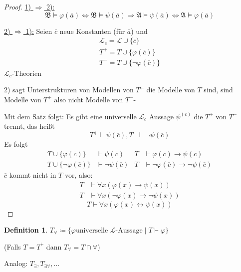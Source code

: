 \documentclass[12pt,parskip=full]{scrartcl}
\newcommand{\heading}{\underline}
\theoremstyle{definition}
\newtheorem{definition}[theorem]{Definition}
\begin{document}
	\begin{proof}
		\heading{1) $\Rightarrow$ 2):}
		\begin{equation*}
			\mathfrak{B} \models \varphi(\overline{a}) \Leftrightarrow \mathfrak{B} \models \psi(\overline{a}) \Rightarrow \mathfrak{A} \models \psi(\overline{a}) \Leftrightarrow \mathfrak{A} \models \varphi(\overline{a})
		\end{equation*}
		
		\heading{2) $\Rightarrow$ 1):}
		Seien $\overline{c}$ neue Konstanten (für $\overline{a}$) und
		\begin{align*}
			\mathcal{L}_c = \mathcal{L} \cup \{ \overline{c} \} \\
			T^+ = T \cup \{ \varphi(\overline{c}) \} \\
			T^- =  T \cup \{ \lnot \varphi(\overline{c}) \}
		\end{align*}
		$\mathcal{L}_c$-Theorien
		
		2) sagt Unterstrukturen von Modellen von $T^+$ die Modelle von $T$ sind, sind Modelle von $T^+$ also nicht Modelle von $T^-$-
		
		Mit dem Satz folgt: Es gibt eine universelle $\mathcal{L}_c$ Aussage $\psi^{(c)}$ die $T^+$ von $T^-$ trennt, das heißt
		\begin{equation*}
			T^+ \vdash \psi(\overline{c}), T^- \vdash \lnot \psi(\overline{c})
		\end{equation*}
		Es folgt
		\begin{align*}
			T \cup \{ \varphi(\overline{c})\} &\vdash \psi(\overline{c}) & T &\vdash \varphi(\overline{c}) \rightarrow \psi(\overline{c}) \\
			T \cup \{ \lnot \varphi(\overline{c}) \} &\vdash \lnot \psi(\overline{c}) & T &\vdash \lnot \varphi(\overline{c}) \rightarrow \lnot \psi(\overline{c})
		\end{align*}
		$\overline{c}$ kommt nicht in $T$ vor, also:
		\begin{align*}
			T &\vdash \forall x (\varphi(x) \rightarrow \psi(x)) \\
			T &\vdash \forall x (\lnot \varphi(x) \rightarrow \lnot \psi(x))
		\end{align*}
		\begin{equation*}
			T \vdash \forall x (\varphi(x) \leftrightarrow \psi(x))
		\end{equation*}
	\end{proof}

	\begin{definition}
		$T_\forall \coloneqq \{ \varphi \text{universelle $\mathcal{L}$-Aussage} \mid T \vdash \varphi \}$
		
		(Falls $T = T^\vdash$ dann $T_\forall = T \cap \forall$)
		
		Analog: $T_\exists, T_{\exists\forall}, \dots$
	\end{definition}
\end{document}
